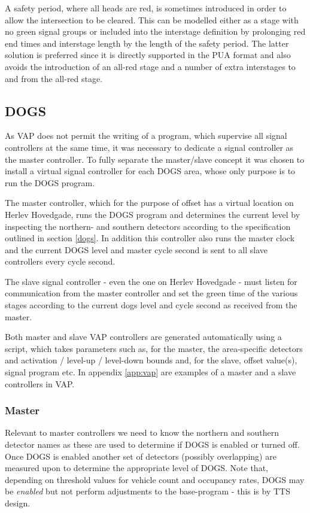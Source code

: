 A safety period, where all heads are red, is sometimes introduced in order to allow the intersection to be cleared. This can be modelled either as a stage with no green signal groups or included into the interstage definition by prolonging red end times and interstage length by the length of the safety period. The latter solution is preferred since it is directly supported in the PUA format and also avoids the introduction of an all-red stage and a number of extra interstages to and from the all-red stage.

\subsection{DOGS}
As VAP does not permit the writing of a program, which supervise all signal controllers at the same time, it was necessary to dedicate a signal controller as the master controller. To fully separate the master/slave concept it was chosen to install a virtual signal controller for each DOGS area, whose only purpose is to run the DOGS program.

The master controller, which for the purpose of offset has a virtual location on Herlev Hovedgade, runs the DOGS program and determines the current level by inspecting the northern- and southern detectors according to the specification outlined in section \ref{dogs}. In addition this controller also runs the master clock and the current DOGS level and master cycle second is sent to all slave controllers every cycle second.

The slave signal controller - even the one on Herlev Hovedgade - must listen for communication from the master controller and set the green time of the various stages according to the current dogs level and cycle second as received from the master.

Both master and slave VAP controllers are generated automatically using a script, which takes parameters such as, for the master, the area-specific detectors and activation / level-up / level-down bounds and, for the slave, offset value(s), signal program etc. In appendix \ref{app:vap} are examples of a master and a slave controllers in VAP.

\subsubsection{Master}
Relevant to master controllers we need to know the northern and southern detector names as these are used to determine if DOGS is enabled or turned off. Once DOGS is enabled another set of detectors (possibly overlapping) are measured upon to determine the appropriate level of DOGS. Note that, depending on threshold values for vehicle count and occupancy rates, DOGS may be \textit{enabled} but not perform adjustments to the base-program - this is by TTS design.


